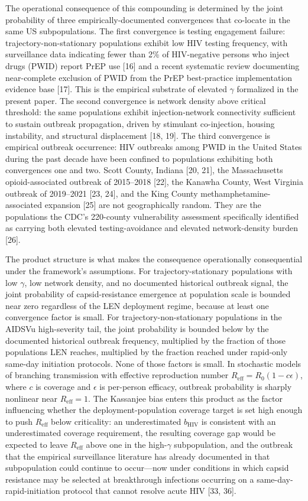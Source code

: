 \documentclass[12pt]{article}
\begin{document}
The operational consequence of this compounding is determined by the joint probability of three empirically-documented convergences that co-locate in the same US subpopulations. The first convergence is testing engagement failure: trajectory-non-stationary populations exhibit low HIV testing frequency, with surveillance data indicating fewer than 2\% of HIV-negative persons who inject drugs (PWID) report PrEP use [16] and a recent systematic review documenting near-complete exclusion of PWID from the PrEP best-practice implementation evidence base [17]. This is the empirical substrate of elevated $\gamma$ formalized in the present paper. The second convergence is network density above critical threshold: the same populations exhibit injection-network connectivity sufficient to sustain outbreak propagation, driven by stimulant co-injection, housing instability, and structural displacement [18, 19]. The third convergence is empirical outbreak occurrence: HIV outbreaks among PWID in the United States during the past decade have been confined to populations exhibiting both convergences one and two. Scott County, Indiana [20, 21], the Massachusetts opioid-associated outbreak of 2015--2018 [22], the Kanawha County, West Virginia outbreak of 2019--2021 [23, 24], and the King County methamphetamine-associated expansion [25] are not geographically random. They are the populations the CDC's 220-county vulnerability assessment specifically identified as carrying both elevated testing-avoidance and elevated network-density burden [26].

The product structure is what makes the consequence operationally consequential under the framework's assumptions. For trajectory-stationary populations with low $\gamma$, low network density, and no documented historical outbreak signal, the joint probability of capsid-resistance emergence at population scale is bounded near zero regardless of the LEN deployment regime, because at least one convergence factor is small. For trajectory-non-stationary populations in the AIDSVu high-severity tail, the joint probability is bounded below by the documented historical outbreak frequency, multiplied by the fraction of those populations LEN reaches, multiplied by the fraction reached under rapid-only same-day initiation protocols. None of those factors is small. In stochastic models of branching transmission with effective reproduction number $R_{\mathrm{eff}} = R_0(1 - c\epsilon)$, where $c$ is coverage and $\epsilon$ is per-person efficacy, outbreak probability is sharply nonlinear near $R_{\mathrm{eff}} = 1$. The Kassanjee bias enters this product as the factor influencing whether the deployment-population coverage target is set high enough to push $R_{\mathrm{eff}}$ below criticality: an underestimated $b_{\mathrm{HIV}}$ is consistent with an underestimated coverage requirement, the resulting coverage gap would be expected to leave $R_{\mathrm{eff}}$ above one in the high-$\gamma$ subpopulation, and the outbreak that the empirical surveillance literature has already documented in that subpopulation could continue to occur---now under conditions in which capsid resistance may be selected at breakthrough infections occurring on a same-day-rapid-initiation protocol that cannot resolve acute HIV [33, 36].
\end{document}

